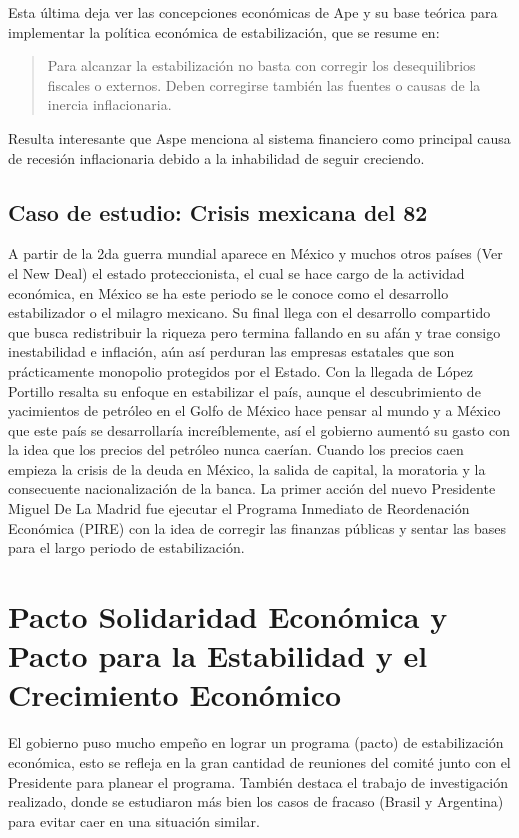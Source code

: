 Esta última deja ver las concepciones económicas de Ape y su base teórica para implementar la política económica de estabilización, que se resume en:
\begin{quote}
    Para alcanzar la estabilización no basta con corregir los desequilibrios fiscales o externos. Deben corregirse también las fuentes o causas de la inercia inflacionaria.
\end{quote}
Resulta interesante que Aspe menciona al sistema financiero como principal causa de recesión inflacionaria debido a la inhabilidad de seguir creciendo.

\subsection{Caso de estudio: Crisis mexicana del 82}
A partir de la 2da guerra mundial aparece en México y muchos otros países (Ver el New Deal) el estado proteccionista, el cual se hace cargo de la actividad económica, en México se ha este periodo se le conoce como el desarrollo estabilizador o el milagro mexicano. Su final llega con el desarrollo compartido que busca redistribuir la riqueza pero termina fallando en su afán y trae consigo inestabilidad e inflación, aún así perduran las empresas estatales que son prácticamente monopolio protegidos por el Estado. Con la llegada de López Portillo resalta su enfoque en estabilizar el país, aunque el descubrimiento de yacimientos de petróleo en el Golfo de México hace pensar al mundo y a México que este país se desarrollaría increíblemente, así el gobierno aumentó su gasto con la idea que los precios del petróleo nunca caerían.
Cuando los precios caen empieza la crisis de la deuda en México, la salida de capital, la moratoria y la consecuente nacionalización de la banca.
La primer acción del nuevo Presidente Miguel De La Madrid fue ejecutar el Programa Inmediato de Reordenación Económica (PIRE) con la idea de corregir las finanzas públicas y sentar las bases para el largo periodo de estabilización.

\section{Pacto Solidaridad Económica y Pacto para la Estabilidad y el Crecimiento Económico}
El gobierno puso mucho empeño en lograr un programa (pacto) de estabilización económica, esto se refleja en la gran cantidad de reuniones del comité junto con el Presidente para planear el programa. También destaca el trabajo de investigación realizado, donde se estudiaron más bien los casos de fracaso (Brasil y Argentina) para evitar caer en una situación similar.

